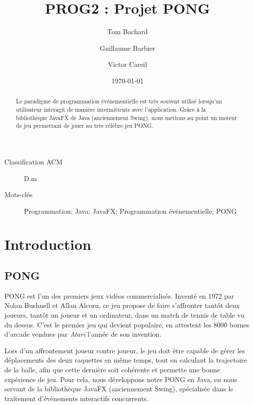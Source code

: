 \documentclass[a4paper,10pt]{article}
\theoremstyle{definition}
\begin{document}
%
\title{PROG2 : Projet PONG}
%
\author{Tom Bachard\and Guillaume Barbier\and Victor Careil}
%
\date{\today}
%
\maketitle
%
%

\begin{description}
  \item[Classification ACM] D.m
  \item[Mots-clés] Programmation; Java; JavaFX; Programmation événementielle; PONG
\end{description}

%
\begin{abstract}
Le paradigme de programmation événementielle est très souvent utilisé lorsqu'un utilisateur interagit de manière intermittente avec l'application. Grâce à la bibliothèque JavaFX de Java (anciennement Swing), nous mettons au point un moteur de jeu permettant de jouer au très célèbre jeu PONG.
\end{abstract}
%

%
\section{Introduction}
%

  \subsection{PONG}
	PONG est l'un des premiers jeux vidéos commercialisés. Inventé en 1972 par Nolan Bushnell et Allan Alcorn, ce jeu propose de faire s'affronter tantôt deux joueurs, tantôt un joueur et un ordinateur, dans un match de tennis de table vu du dessus. C'est le premier jeu qui devient populaire, en attestent les 8000 bornes d'arcade vendues par \emph{Atari} l'année de son invention.
	
	Lors d'un affrontement joueur contre joueur, le jeu doit être capable de gérer les déplacements des deux raquettes en même temps, tout en calculant la trajectoire de la balle, afin que cette dernière soit cohérente et permette une bonne expérience de jeu. Pour cela, nous développons notre PONG en Java, en nous servant de la bibliothèque JavaFX (anciennement Swing), spécialisée dans le traitement d'événements interactifs concurrents.
	
\end{document}
